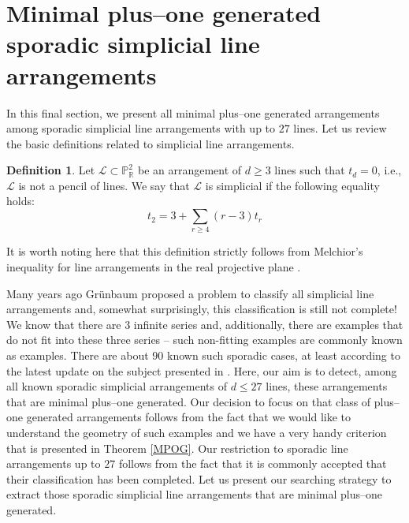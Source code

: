 \documentclass[12pt]{article}
\theoremstyle{plain}
\theoremstyle{definition}
\newtheorem{definition}[thm]{Definition}
\begin{document}
\section{Minimal plus--one generated sporadic simplicial line arrangements}
In this final section, we present all minimal plus--one generated arrangements among sporadic simplicial line arrangements with up to $27$ lines.
Let us review the basic definitions related to simplicial line arrangements.

\begin{definition}
Let $\mathcal{L} \subset \mathbb{P}^{2}_{\mathbb{R}}$ be an arrangement of $d\geq 3$ lines such that $t_{d} = 0$, i.e., $\mathcal{L}$ is not a pencil of lines. We say that $\mathcal{L}$ is simplicial if the following equality holds:
\begin{equation}
t_{2} = 3 + \sum_{r\geq 4}(r-3)t_{r}
\end{equation}
\end{definition}
 It is worth noting here that this definition strictly follows from Melchior's inequality for line arrangements in the real projective plane \cite{Melchior}.

Many years ago Gr\"unbaum proposed a problem to classify all simplicial line arrangements and, somewhat surprisingly, this classification is still not complete! We know that there are $3$ infinite series and, additionally, there are examples that do not fit into these three series -- such non-fitting examples are commonly known as  examples. There are about $90$ known such sporadic cases, at least according to the latest update on the subject presented in \cite{Cuntz}. Here, our aim is to detect, among all known sporadic simplicial arrangements of $d\leq 27$ lines, these arrangements that are minimal plus--one generated. Our decision to focus on that class of plus--one generated arrangements follows from the fact that we would like to understand the geometry of such examples and we have a very handy criterion that is presented in Theorem \ref{MPOG}. Our restriction to sporadic line arrangements up to $27$ follows from the fact that it is commonly accepted that their classification has been completed. Let us present our searching strategy to extract those sporadic simplicial line arrangements that are minimal plus--one generated.
\end{document}
